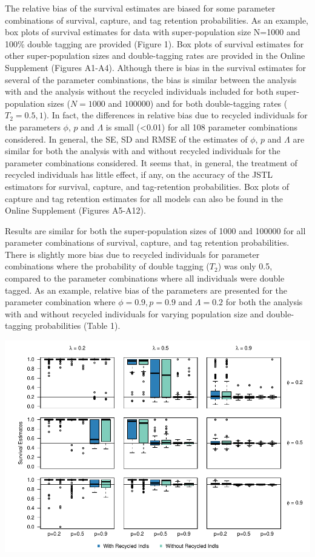 \documentclass[12pt]{article}
\begin{document}
The relative bias of the survival estimates are biased for some
parameter combinations of survival, capture, and tag retention
probabilities. As an example, box plots of survival estimates for data
with super-population size N=1000 and 100\% double tagging are provided
(Figure 1). Box plots of survival estimates for other super-population
sizes and double-tagging rates are provided in the Online Supplement (Figures
A1-A4). Although there is bias in the survival estimates for several of
the parameter combinations, the bias is similar between the analysis
with and the analysis without the recycled individuals included for both
super-population sizes (\(N=1000\) and \(100 000\)) and for both
double-tagging rates (\(T_2=0.5,1\)). In fact, the differences in
relative bias due to recycled individuals for the parameters \(\phi\),
\(p\) and \(\Lambda\) is small (\textless{}0.01) for all 108 parameter
combinations considered. In general, the SE, SD and RMSE of the
estimates of \(\phi\), \(p\) and \(\Lambda\) are similar for both the
analysis with and without recycled individuals for the parameter
combinations considered. It seems that, in general, the treatment of
recycled individuals has little effect, if any, on the accuracy of the
JSTL estimators for survival, capture, and tag-retention probabilities.
Box plots of capture and tag retention estimates for all models can also
be found in the Online Supplement (Figures A5-A12).

Results are similar for both the super-population sizes of 1000 and
100000 for all parameter combinations of survival, capture, and tag
retention probabilities. There is slightly more bias due to recycled
individuals for parameter combinations where the probability of double
tagging (\(T_2\)) was only 0.5, compared to the parameter combinations
where all individuals were double tagged. As an example, relative bias of
the parameters are presented for the parameter combination where
\(\phi=0.9, p=0.9\) and \(\Lambda=0.2\) for both the analysis with and
without recycled individuals for varying population size and
double-tagging probabilities (Table 1).

\includegraphics{RecycledPaper_files/figure-latex/Figure1_survival_GJSTL1-1.pdf}
\end{document}
